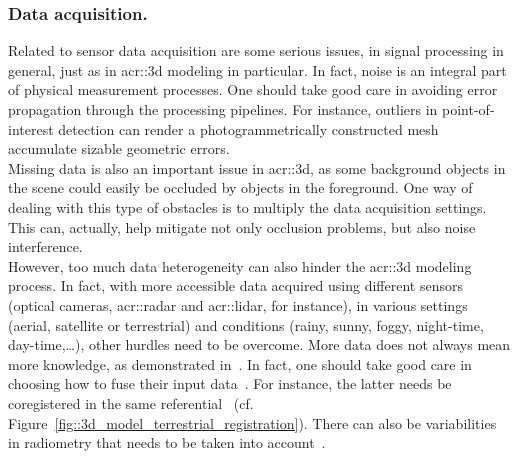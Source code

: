         \subsubsection{Data acquisition.}
            Related to sensor data acquisition are some serious issues, in signal processing in general, just as in \gls{acr::3d} modeling in particular.
            In fact, noise is an integral part of physical measurement processes.
            One should take good care in avoiding error propagation through the processing pipelines.
            For instance, outliers in point-of-interest detection can render a photogrammetrically constructed mesh accumulate sizable geometric errors.\\
            Missing data is also an important issue in \gls{acr::3d}, as some background objects in the scene could easily be occluded by objects in the foreground.
            One way of dealing with this type of obstacles is to multiply the data acquisition settings.
            This can, actually, help mitigate not only occlusion problems, but also noise interference.\\
            However, too much data heterogeneity can also hinder the \gls{acr::3d} modeling process.
            In fact, with more accessible data acquired using different sensors (optical cameras, \gls{acr::radar} and \gls{acr::lidar}, for instance), in various settings (aerial, satellite or terrestrial) and conditions (rainy, sunny, foggy, night-time, day-time,\dots), other hurdles need to be overcome.
            More data does not always mean more knowledge, as demonstrated in~\parencite{brachmann2018learning}.
            In fact, one should take good care in choosing how to fuse their input data~\parencite{kedzierski2014terrestrial}.
            For instance, the latter needs be coregistered in the same referential~\parencite{monnier2013registration, mezian2016uncertainty} (cf. Figure~\ref{fig::3d_model_terrestrial_registration}).
            There can also be variabilities in radiometry that needs to be taken into account~\parencite{yan2012improving}.
